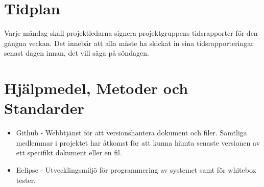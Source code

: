 \documentclass[a4paper]{article}
\begin{document}
\section{Tidplan}
\begin{comment} 
I tidplanen ska det finnas en detaljerad nedbrytning av det arbete som ska ske i aktiviteter. Det ska också finnas skattningar av arbetstid (dvs "effort"), ledtid och datum för när aktiviteter ska vara färdiga. Det betyder att man ska kunna utläsa minst följande: 

1. Skattad tidsåtgång för varje fas (hur fördelas arbetsinsatsen över projektets faser?)
2. Skattad start- och slutdatum för varje fas (när blir olika delar klara?)
3. Skattad tidsåtgång för varje dokument (vad kostar varje del?)
4. Skattad start- och slutdatum för varje dokument (när blir olika dokument klara?)
5. Skattad tidsåtgång för olika aktiviteter och aktivitetstyper i respektive fas (vad lägger man tiden på?). (Möten, granskningar, ändringshantering, rapportering, osv)
6. Skattad tidåtgång för varje grupp, uppdelat per vecka (går det in på en 40-timmarsvecka?)
7. En kalenderplan där man kan se vad varje grupp ska göra varje vecka (vem ska göra vad och när?) Detta kan tex åskådliggöras i ett gantt-schema.
8. Det ska även vara tydligt vilka möten som är planerade under projektet, både interna möten och möten där externa intressenter är med.

Ange även i projektplanen vilka metoder ni använt för att göra skattningar av tid och kostnad, samt vilka de största osäkerheterna är med skattningarna.

\end{comment}

Varje måndag skall projektledarna signera projektgruppens tidsrapporter för den gångna veckan. Det innebär att alla måste ha skickat in sina tidsrapporteringar senast dagen innan, det vill säga på söndagen.

\section{Hjälpmedel, Metoder och Standarder}
\begin{comment}En beskrivning av ovanstående som projektet avser att använda.\end{comment}

\begin{itemize}
\item Github - Webbtjänst för att versionshantera dokument och filer. Samtliga medlemmar i projektet har åtkomst för att kunna hämta senaste versionen av ett specifikt dokument eller en fil.
\item Eclipse - Utvecklingsmiljö för programmering av systemet samt för whitebox tester.

\end{itemize}
\end{document}
